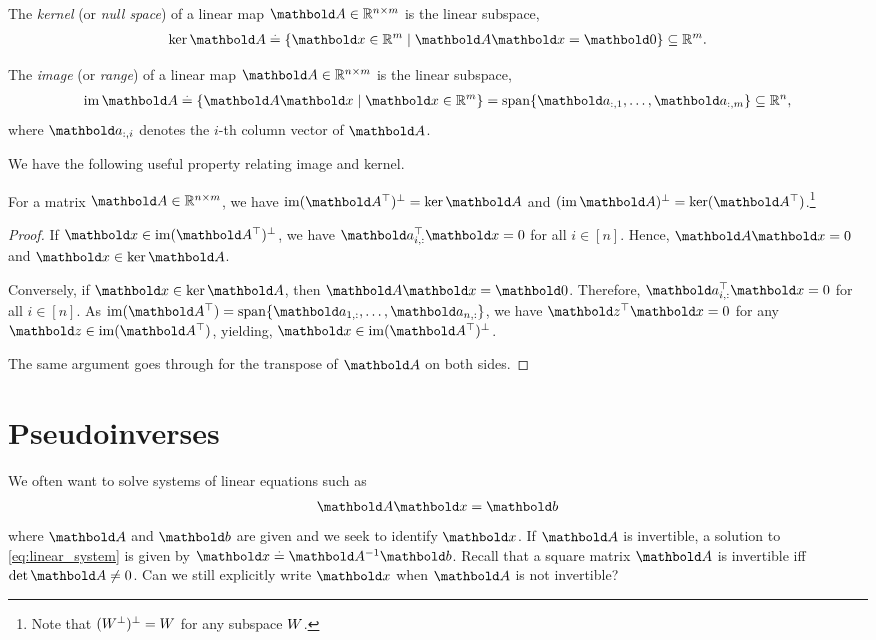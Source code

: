 \begin{defn}[Kernel] The \emph{kernel} (or \emph{null space}) of a linear map $\mA \in \R^{n \times m}$ is the linear subspace, \begin{align}
    \ker\mA \defeq \{\vx \in \R^m \mid \mA\vx = \vZero\}\subseteq \R^m.
\end{align}
\end{defn}
\begin{defn}[Image] The \emph{image} (or \emph{range}) of a linear map $\mA \in \R^{n \times m}$ is the linear subspace, \begin{align}
    \im\mA \defeq \{\mA\vx \mid \vx \in \R^m\} = \vspan\{\va_{:,1}, \dots, \va_{:,m}\} \subseteq \R^n,
\end{align} where $\va_{:,i}$ denotes the $i$-th column vector of $\mA$.
\end{defn}

We have the following useful property relating image and kernel.

\begin{lem}
For a matrix $\mA \in \R^{n \times m}$, we have $\compl{\im(\trans{\mA})} = \ker\mA$ and $\compl{(\im\mA)} = \ker(\trans{\mA})$.\footnote{Note that $(W^\bot)^\bot = W$ for any subspace $W$.}
\end{lem}
\begin{proof}
If $\vx \in \compl{\im(\trans{\mA})}$, we have $\trans{\va_{i,:}}\vx = 0$ for all $i \in [n]$. Hence, $\mA\vx = 0$ and $\vx \in \ker\mA$.

Conversely, if $\vx \in \ker\mA$, then $\mA\vx = \vZero$. Therefore, $\trans{\va_{i,:}}\vx = 0$ for all $i \in [n]$. As $\im(\trans{\mA}) = \vspan\{\va_{1,:}, \dots, \va_{n,:}\}$, we have $\trans{\vz}\vx = 0$ for any $\vz \in \im(\trans{\mA})$, yielding, $\vx \in \compl{\im(\trans{\mA})}$.

The same argument goes through for the transpose of $\mA$ on both sides.
\end{proof}

\section{Pseudoinverses}

We often want to solve systems of linear equations such as \begin{align}
    \mA\vx = \vb \label{eq:linear_system}
\end{align} where $\mA$ and $\vb$ are given and we seek to identify $\vx$. If $\mA$ is invertible, a solution to \cref{eq:linear_system} is given by $\vx \defeq \inv{\mA}\vb$. Recall that a square matrix $\mA$ is invertible iff $\det\mA \neq 0$. Can we still explicitly write $\vx$ when $\mA$ is not invertible?

